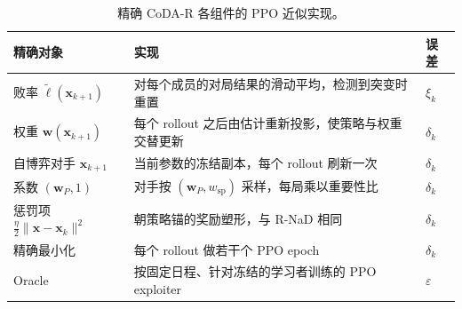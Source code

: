 \documentclass{article}
\theoremstyle{plain}
\theoremstyle{remark}
\newcommand{\bx}{{\bm{x}}}
\newcommand{\bw}{{\bm{w}}}
\newcommand{\bell}{{\bm{\ell}}}
\newcommand{\aug}{\tilde{\bell}}
\newcommand{\wsp}{w_{\mathrm{sp}}}
\newcommand{\codar}{CoDA-R}
\begin{document}
\begin{table}[!htbp]
\caption{精确 \codar{} 各组件的 PPO 近似实现。}
\label{tab:impl}
\begin{center}
\footnotesize
\setlength{\tabcolsep}{4pt}
\begin{tabular}{p{3.6cm}p{8.2cm}l}
\toprule
精确对象 & 实现 & 误差 \\
\midrule
败率 $\aug(\bx_{k+1})$ & 对每个成员的对局结果的滑动平均，检测到突变时重置 & $\xi_k$ \\
权重 $\bw(\bx_{k+1})$ & 每个 rollout 之后由估计重新投影，使策略与权重交替更新 & $\delta_k$ \\
自博弈对手 $\bx_{k+1}$ & 当前参数的冻结副本，每个 rollout 刷新一次 & $\delta_k$ \\
系数 $(\bw_P,1)$ & 对手按 $(\bw_P,\wsp)$ 采样，每局乘以重要性比 & $\delta_k$ \\
惩罚项 $\tfrac\eta2\|\bx-\bx_k\|^2$ & 朝策略锚的奖励塑形，与 R-NaD 相同 & $\delta_k$ \\
精确最小化 & 每个 rollout 做若干个 PPO epoch & $\delta_k$ \\
Oracle & 按固定日程、针对冻结的学习者训练的 PPO exploiter & $\varepsilon$ \\
\bottomrule
\end{tabular}
\end{center}
\end{table}
\end{document}
